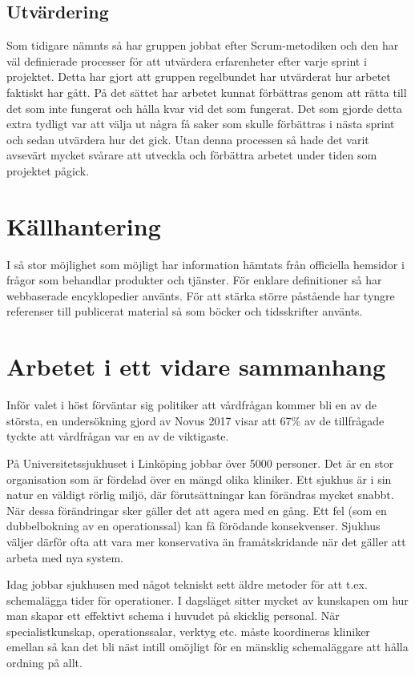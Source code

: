 \subsection{Utvärdering}
Som tidigare nämnts så har gruppen jobbat efter Scrum-metodiken och den har väl definierade processer för att utvärdera erfarenheter efter varje sprint i projektet. Detta har gjort att gruppen regelbundet har utvärderat hur arbetet faktiskt har gått. På det sättet har arbetet kunnat förbättras genom att rätta till det som inte fungerat och hålla kvar vid det som fungerat. Det som gjorde detta extra tydligt var att välja ut några få saker som skulle förbättras i nästa sprint och sedan utvärdera hur det gick. Utan denna processen så hade det varit avsevärt mycket svårare att utveckla och förbättra arbetet under tiden som projektet pågick.

\section{Källhantering} \label{sec:källhantering}
I så stor möjlighet som möjligt har information hämtats från officiella hemsidor i frågor som behandlar produkter och tjänster. För enklare definitioner så har webbaserade encyklopedier använts. För att stärka större påstående har tyngre referenser till publicerat material så som böcker och tidsskrifter använts.

\section{Arbetet i ett vidare sammanhang}\label{sec:vidare}

Inför valet i höst förväntar sig politiker att vårdfrågan kommer bli en av de största, en undersökning gjord av Novus 2017 visar att 67\% av de tillfrågade tyckte att vårdfrågan var en av de viktigaste.\cite{novus}

På Universitetssjukhuset i Linköping jobbar över 5000 personer. Det är en stor organisation som är fördelad över en mängd olika kliniker. Ett sjukhus är i sin natur en väldigt rörlig miljö, där förutsättningar kan förändras mycket snabbt. När dessa förändringar sker gäller det att agera med en gång. Ett fel (som en dubbelbokning av en operationssal) kan få förödande konsekvenser. Sjukhus väljer därför ofta att vara mer konservativa än framåtskridande när det gäller att arbeta med nya system.

Idag jobbar sjukhusen med något tekniskt sett äldre metoder för att t.ex. schemalägga tider för operationer. I dagsläget sitter mycket av kunskapen om hur man skapar ett effektivt schema i huvudet på skicklig personal. När specialistkunskap, operationssalar, verktyg etc. måste koordineras kliniker emellan så kan det bli näst intill omöjligt för en mänsklig schemaläggare att hålla ordning på allt.


